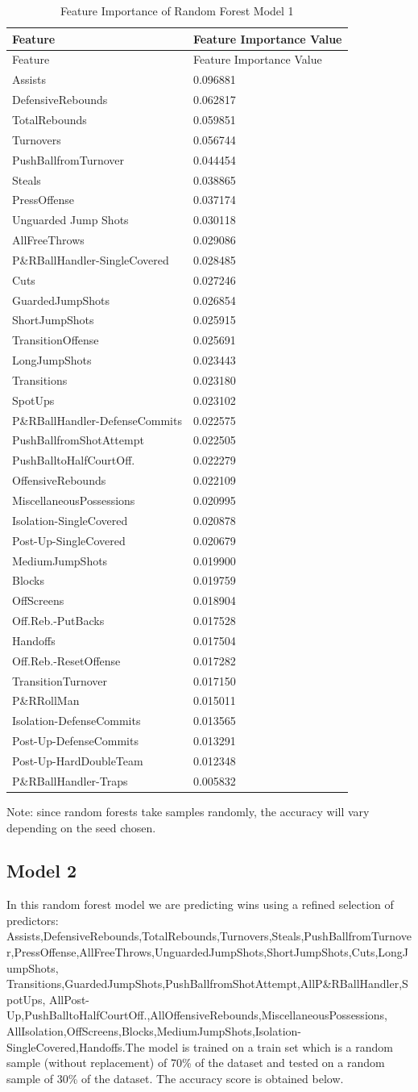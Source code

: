 \documentclass[]{book}
\begin{document}
\begin{longtable}[]{@{}ll@{}}
\caption{Feature Importance of Random Forest Model 1}\tabularnewline
\toprule
Feature & Feature Importance Value\tabularnewline
\midrule
\endfirsthead
\toprule
Feature & Feature Importance Value\tabularnewline
\midrule
\endhead
Assists & 0.096881\tabularnewline
DefensiveRebounds & 0.062817\tabularnewline
TotalRebounds & 0.059851\tabularnewline
Turnovers & 0.056744\tabularnewline
PushBallfromTurnover & 0.044454\tabularnewline
Steals & 0.038865\tabularnewline
PressOffense & 0.037174\tabularnewline
Unguarded Jump Shots & 0.030118\tabularnewline
AllFreeThrows & 0.029086\tabularnewline
P\&RBallHandler-SingleCovered & 0.028485\tabularnewline
Cuts & 0.027246\tabularnewline
GuardedJumpShots & 0.026854\tabularnewline
ShortJumpShots & 0.025915\tabularnewline
TransitionOffense & 0.025691\tabularnewline
LongJumpShots & 0.023443\tabularnewline
Transitions & 0.023180\tabularnewline
SpotUps & 0.023102\tabularnewline
P\&RBallHandler-DefenseCommits & 0.022575\tabularnewline
PushBallfromShotAttempt & 0.022505\tabularnewline
PushBalltoHalfCourtOff. & 0.022279\tabularnewline
OffensiveRebounds & 0.022109\tabularnewline
MiscellaneousPossessions & 0.020995\tabularnewline
Isolation-SingleCovered & 0.020878\tabularnewline
Post-Up-SingleCovered & 0.020679\tabularnewline
MediumJumpShots & 0.019900\tabularnewline
Blocks & 0.019759\tabularnewline
OffScreens & 0.018904\tabularnewline
Off.Reb.-PutBacks & 0.017528\tabularnewline
Handoffs & 0.017504\tabularnewline
Off.Reb.-ResetOffense & 0.017282\tabularnewline
TransitionTurnover & 0.017150\tabularnewline
P\&RRollMan & 0.015011\tabularnewline
Isolation-DefenseCommits & 0.013565\tabularnewline
Post-Up-DefenseCommits & 0.013291\tabularnewline
Post-Up-HardDoubleTeam & 0.012348\tabularnewline
P\&RBallHandler-Traps & 0.005832\tabularnewline
\bottomrule
\end{longtable}

Note: since random forests take samples randomly, the accuracy will vary depending on the seed chosen.

\hypertarget{model-2}{%
\subsection{Model 2}\label{model-2}}

In this random forest model we are predicting wins using a refined selection of predictors: Assists,DefensiveRebounds,TotalRebounds,Turnovers,Steals,PushBallfromTurnover,PressOffense,AllFreeThrows,UnguardedJumpShots,ShortJumpShots,Cuts,LongJumpShots,
Transitions,GuardedJumpShots,PushBallfromShotAttempt,AllP\&RBallHandler,SpotUps,
AllPost-Up,PushBalltoHalfCourtOff.,AllOffensiveRebounds,MiscellaneousPossessions,
AllIsolation,OffScreens,Blocks,MediumJumpShots,Isolation-SingleCovered,Handoffs.The model is trained on a train set which is a random sample (without replacement) of 70\% of the dataset and tested on a random sample of 30\% of the dataset. The accuracy score is obtained below.
\end{document}
